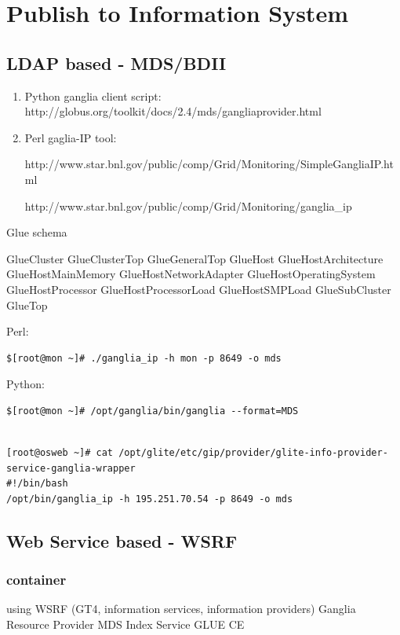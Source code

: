\section{Publish to Information System}

\subsection{LDAP based - MDS/BDII}
\begin{enumerate}
  \item Python ganglia client script:
  http://globus.org/toolkit/docs/2.4/mds/gangliaprovider.html
  \item Perl gaglia-IP tool:
  
  http://www.star.bnl.gov/public/comp/Grid/Monitoring/SimpleGangliaIP.html
  
  http://www.star.bnl.gov/public/comp/Grid/Monitoring/ganglia\_ip

\end{enumerate}

\newpage
Glue schema

GlueCluster
GlueClusterTop
GlueGeneralTop
GlueHost
GlueHostArchitecture
GlueHostMainMemory
GlueHostNetworkAdapter
GlueHostOperatingSystem
GlueHostProcessor
GlueHostProcessorLoad
GlueHostSMPLoad
GlueSubCluster
GlueTop

Perl:
\begin{lstlisting}
$[root@mon ~]# ./ganglia_ip -h mon -p 8649 -o mds
\end{lstlisting}

Python:
\begin{lstlisting}
$[root@mon ~]# /opt/ganglia/bin/ganglia --format=MDS
\end{lstlisting}

\begin{lstlisting}

[root@osweb ~]# cat /opt/glite/etc/gip/provider/glite-info-provider-service-ganglia-wrapper
#!/bin/bash
/opt/bin/ganglia_ip -h 195.251.70.54 -p 8649 -o mds
\end{lstlisting}

\newpage

\subsection{Web Service based - WSRF}
\subsubsection{container}
using WSRF (GT4, information services, information providers)
Ganglia Resource Provider
MDS Index Service
GLUE CE 

